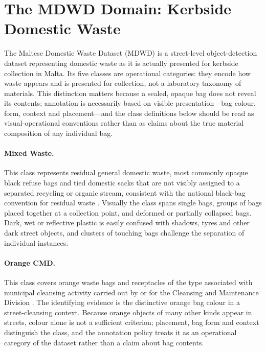 \section{The MDWD Domain: Kerbside Domestic Waste}
\label{sec:bg-mdwd}

The Maltese Domestic Waste Dataset (MDWD) is a street-level object-detection dataset representing domestic waste as it is actually presented for kerbside collection in Malta. Its five classes are operational categories: they encode how waste appears and is presented for collection, not a laboratory taxonomy of materials. This distinction matters because a sealed, opaque bag does not reveal its contents; annotation is necessarily based on visible presentation---bag colour, form, context and placement---and the class definitions below should be read as visual-operational conventions rather than as claims about the true material composition of any individual bag.

\paragraph{Mixed Waste.} This class represents residual general domestic waste, most commonly opaque black refuse bags and tied domestic sacks that are not visibly assigned to a separated recycling or organic stream, consistent with the national black-bag convention for residual waste \citep{wastecollection2026web}. Visually the class spans single bags, groups of bags placed together at a collection point, and deformed or partially collapsed bags. Dark, wet or reflective plastic is easily confused with shadows, tyres and other dark street objects, and clusters of touching bags challenge the separation of individual instances.

\paragraph{Orange CMD.} This class covers orange waste bags and receptacles of the type associated with municipal cleansing activity carried out by or for the Cleansing and Maintenance Division \citep{cmd2026web}. The identifying evidence is the distinctive orange bag colour in a street-cleansing context. Because orange objects of many other kinds appear in streets, colour alone is not a sufficient criterion; placement, bag form and context distinguish the class, and the annotation policy treats it as an operational category of the dataset rather than a claim about bag contents.

